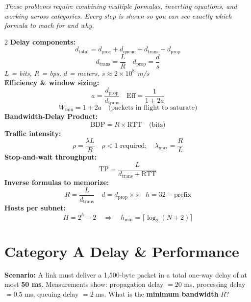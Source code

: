 \documentclass[11pt, letterpaper]{article}
\begin{document}
\vspace{6pt}
\begin{center}\small\itshape
  These problems require combining multiple formulas, inverting equations, and working
  across categories. Every step is shown so you can see exactly which formula to reach
  for and why.
\end{center}
\vspace{4pt}

\begin{tcolorbox}[colback=notebg, colframe=noteborder,
  title={\bfseries Formula Reference Card --- Keep This Visible While Solving}, arc=3pt, boxrule=1pt]
\footnotesize
\begin{multicols}{2}
\textbf{Delay components:}
\[d_{\text{total}} = d_{\text{proc}} + d_{\text{queue}} + d_{\text{trans}} + d_{\text{prop}}\]
\[d_{\text{trans}} = \frac{L}{R} \quad d_{\text{prop}} = \frac{d}{s}\]
\textit{$L$ = bits, $R$ = bps, $d$ = meters, $s \approx 2\times10^8$ m/s}\\[4pt]
\textbf{Efficiency \& window sizing:}
\[a = \frac{d_{\text{prop}}}{d_{\text{trans}}} \quad \text{Eff} = \frac{1}{1+2a}\]
\[W_{\min} = 1 + 2a \quad \text{(packets in flight to saturate)}\]
\columnbreak
\textbf{Bandwidth-Delay Product:}
\[\text{BDP} = R \times \text{RTT} \quad \text{(bits)}\]
\textbf{Traffic intensity:}
\[\rho = \frac{\lambda L}{R} \quad \rho < 1\text{ required};\quad \lambda_{\max} = \frac{R}{L}\]
\textbf{Stop-and-wait throughput:}
\[\text{TP} = \frac{L}{d_{\text{trans}} + \text{RTT}}\]
\textbf{Inverse formulas to memorize:}
\[R = \frac{L}{d_{\text{trans}}} \quad d = d_{\text{prop}} \times s \quad h = 32 - \text{prefix}\]
\textbf{Hosts per subnet:}
\[H = 2^h - 2 \quad \Longrightarrow \quad h_{\min} = \lceil\log_2(N+2)\rceil\]
\end{multicols}
\end{tcolorbox}

\newpage

\section*{Category A \quad Delay \& Performance}

\begin{tcolorbox}[colback=part4bg, colframe=sectionorange,
  title={\bfseries Problem A1 --- Inverse Formula: Solve for Required Bandwidth}, arc=3pt, boxrule=1pt]
\textbf{Scenario:} A link must deliver a 1{,}500-byte packet in a total one-way delay of
at most \textbf{50 ms}. Measurements show: propagation delay $= 20$ ms, processing delay
$= 0.5$ ms, queuing delay $= 2$ ms. What is the \textbf{minimum bandwidth} $R$?
\end{tcolorbox}
\end{document}
